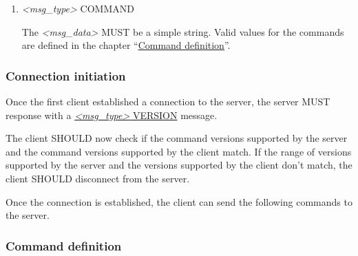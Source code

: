 \documentclass[]{article}
\begin{document}
\begin{enumerate}
\begin{enumerate}
                The \emph{\textless{}msg\_data\textgreater{}} MUST be a json string having the following structure:
\begin{verbatim}
{
    "minVersion": <min_version>,
    "maxVersion": <max_version>
}
\end{verbatim}

                \emph{\textless{}min\_version\textgreater{}} MUST contain the minimum version of commands that is supported by the current connection.

                \emph{\textless{}max\_version\textgreater{}} MUST contain the maximum version of commands that is supported by the current connection.

                The server or client MUST support all commands that are defined for the range between \emph{\textless{}min\_version\textgreater{}} and \emph{\textless{}max\_version\textgreater{}}, including both boundary values.

            \item \emph{\textless{}msg\_type\textgreater{}} COMMAND
                \label{msg_command}

                The \emph{\textless{}msg\_data\textgreater{}} MUST be a simple string. Valid values for the commands are defined in the chapter ``\hyperref[command_definition]{Command definition}''.
  \end{enumerate}
\end{enumerate}

\subsubsection{Connection initiation}

Once the first client established a connection to the server, the server MUST response with a \hyperref[msg_version]{\emph{\textless{}msg\_type\textgreater{}} VERSION} message.

The client SHOULD now check if the command versions supported by the server and the command versions supported by the client match. If the range of versions supported by the server and the versions supported by the client don't match, the client SHOULD disconnect from the server.

Once the connection is established, the client can send the following commands to the server.

\subsubsection{Command definition}
\label{command_definition}
\end{document}
